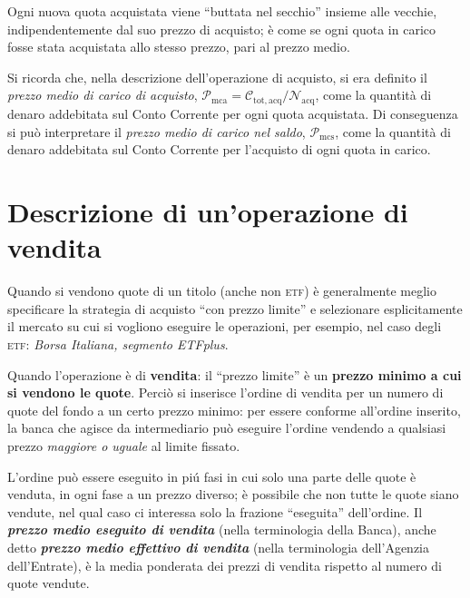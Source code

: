 \documentclass[12pt,a4paper]{article}
\newcommand{\Undefine}[1]{\let#1\CustomUndefined}
\newcommand{\Define}[2]{%
\Undefine{#1}
\newcommand{#1}{#2}
}
\newcommand{\Parentesi}[1]{(#1)}
\newcommand{\Virgolette}[1]{``#1''}
\newcommand{\Etf}[1]{\textsc{etf}}
\newcommand{\Nacq}[1]{\mathcal{N}_{\textrm{acq}#1}}
\newcommand{\Pmc}[1]{\mathcal{P}_{\mathrm{mc}#1}}
\newcommand{\Pmca}[1]{\Pmc{\mathrm{a}#1}}
\newcommand{\Pmcs}[1]{\Pmc{\mathrm{s}#1}}
\newcommand{\Ctotacq}[1]{\mathcal{C}_{\mathrm{tot,acq}#1}}
\begin{document}
Ogni  nuova  quota   acquistata  viene  \Virgolette{buttata  nel  secchio}   insieme  alle  vecchie,
indipendentemente dal suo prezzo di acquisto; è come  se ogni quota in carico fosse stata acquistata
allo stesso prezzo, pari al prezzo medio.

Si ricorda che, nella descrizione dell'operazione di acquisto, si era definito il \emph{prezzo medio
   di carico di acquisto}, \(\Pmca{} = \Ctotacq{} / \Nacq{}\), come la quantità di denaro addebitata
sul Conto Corrente  per ogni quota acquistata.   Di conseguenza si può  interpretare il \emph{prezzo
   medio di carico nel saldo}, \(\Pmcs{}\), come la quantità di denaro addebitata sul Conto Corrente
per l'acquisto di ogni quota in carico.

\section{Descrizione di un'operazione di vendita}



\Define{\UnoNumeroQuote}{20}
\Define{\DueNumeroQuote}{30}
\Define{\TreNumeroQuote}{50}
\Define{\UnoPrezzoEseguito}{52,00}
\Define{\DuePrezzoEseguito}{53,00}
\Define{\TrePrezzoEseguito}{55,00}


Quando si vendono quote di un titolo  \Parentesi{anche non \Etf{}} è generalmente meglio specificare
la strategia di  acquisto \Virgolette{con prezzo limite} e selezionare  esplicitamente il mercato su
cui si vogliono  eseguire le operazioni, per  esempio, nel caso degli  \Etf{}: \emph{Borsa Italiana,
   segmento ETFplus}.

Quando l'operazione è di \textbf{vendita}: il  \Virgolette{prezzo limite} è un \textbf{prezzo minimo
   a cui si vendono le  quote}.  Perciò si inserisce l'ordine di vendita per  un numero di quote del
fondo a  un certo prezzo  minimo: per essere  conforme all'ordine inserito,  la banca che  agisce da
intermediario può eseguire  l'ordine vendendo a qualsiasi prezzo \emph{maggiore  o uguale} al limite
fissato.

L'ordine può essere eseguito in piú fasi in cui solo una parte delle quote è venduta, in ogni fase a
un prezzo diverso; è possibile che non tutte le quote siano vendute, nel qual caso ci interessa solo
la frazione \Virgolette{eseguita} dell'ordine.  Il  \textbf{\emph{prezzo medio eseguito di vendita}}
(nella  terminologia della  Banca), anche  detto \textbf{\emph{prezzo  medio effettivo  di vendita}}
(nella terminologia dell'Agenzia dell'Entrate), è la  media ponderata dei prezzi di vendita rispetto
al numero di quote vendute.
\end{document}

